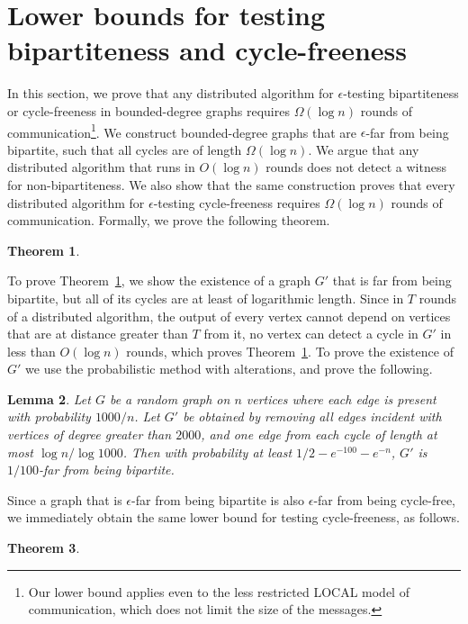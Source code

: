 \documentclass[11pt]{article}
\newtheorem{theorem}{Theorem}[section]
\newtheorem{lemma}[theorem]{Lemma}
\begin{document}
\section{Lower bounds for testing bipartiteness and cycle-freeness}
\label{sec:lowerbounds}
In this section, we prove that any distributed algorithm for $\epsilon$-testing bipartiteness or cycle-freeness in
bounded-degree graphs requires $\Omega(\log n)$ rounds of communication\footnote{Our lower bound applies even to the less restricted LOCAL model of communication, which does not limit the size of the messages.}. We
construct bounded-degree graphs that are $\epsilon$-far from being bipartite, such that all cycles
are of length $\Omega(\log n)$.  We argue that any distributed algorithm that runs in $O(\log n)$ rounds does not detect a witness for non-bipartiteness. We also show that the same
construction proves that every distributed algorithm for $\epsilon$-testing cycle-freeness
requires $\Omega(\log n)$ rounds of communication.
Formally, we prove the following theorem.
\begin{theorem}
\ThmLBBi
  \label{thm:bipart-lower-bound}
\end{theorem}

To prove Theorem~\ref{thm:bipart-lower-bound}, we show the existence of a graph $G'$ that is far from being bipartite, but all of its cycles are at least of logarithmic length. Since in $T$ rounds of a distributed algorithm, the output of every vertex cannot depend on vertices that are at distance greater than $T$ from it, no vertex can detect a cycle in $G'$ in less than $O(\log{n})$ rounds, which proves Theorem~\ref{thm:bipart-lower-bound}. To prove the existence of $G'$ we use the probabilistic method with alterations, and prove the following.
\begin{lemma}
  Let $G$ be a random graph on $n$ vertices where each edge is present with probability $1000/n$.
  Let $G'$ be obtained by removing all edges incident with vertices of degree greater than $2000$, and
  one edge from each cycle of length at most $\log n/\log 1000$. Then with probability at least
  $1/2 - e^{-100} - e^{-n}$, $G'$ is $1/100$-far from being bipartite.
  \label{lem:graph-far}
\end{lemma}

Since a graph that is $\epsilon$-far from being bipartite is also $\epsilon$-far from being cycle-free, we immediately obtain the same lower bound for testing cycle-freeness, as follows.

\begin{theorem}
\ThmLBCycle
  \label{cor:cycle-lower-bound}
\end{theorem}
\end{document}

